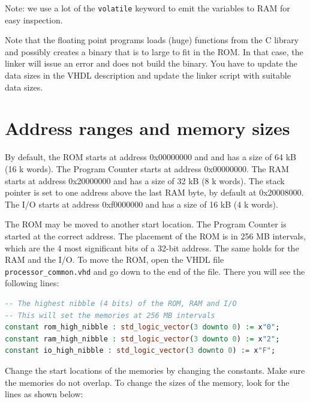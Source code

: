 \documentclass[12pt]{article}
\begin{document}
Note: we use a lot of the \texttt{volatile} keyword to emit the variables to RAM for easy inspection.

Note that the floating point programs loads (huge) functions from the C library and possibly creates a binary that is to large to fit in the ROM. In that case, the linker will issue an error and does not build the binary. You have to update the data sizes in the VHDL description and update the linker script with suitable data sizes.

\section{Address ranges and memory sizes}
By default, the ROM starts at address 0x00000000 and and has a size of 64 kB (16 k words). The Program Counter starts at address 0x00000000. The RAM starts at address 0x20000000 and has a size of 32 kB (8 k words). The stack pointer is set to one address above the last RAM byte, by default at 0x20008000. The I/O starts at address 0xf0000000 and has a size of 16 kB (4 k words).

The ROM may be moved to another start location. The Program Counter is started at the correct address. The placement of the ROM is in 256 MB intervals, which are the 4 most significant bits of a 32-bit address. The same holds for the RAM and the I/O. To move the ROM, open the VHDL file \lstinline|processor_common.vhd| and go down to the end of the file. There you will see the following lines:

\begin{lstlisting}[language=VHDL]
-- The highest nibble (4 bits) of the ROM, RAM and I/O
-- This will set the memories at 256 MB intervals
constant rom_high_nibble : std_logic_vector(3 downto 0) := x"0";
constant ram_high_nibble : std_logic_vector(3 downto 0) := x"2";
constant io_high_nibble : std_logic_vector(3 downto 0) := x"F";
\end{lstlisting}

Change the start locations of the memories by changing the constants. Make sure the memories do not overlap. To change the sizes of the memory, look for the lines as shown below:
\end{document}
